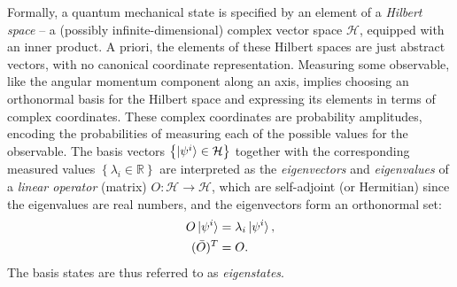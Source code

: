 \documentclass[final,3p,mathptmx]{elsarticle}
\begin{document}
Formally, a quantum mechanical state is specified by an element of a \emph{Hilbert space} -- a (possibly infinite-dimensional) complex vector space $\mathcal{H}$, equipped with an inner product. A priori, the elements of these Hilbert spaces are just abstract vectors, with no canonical coordinate representation. Measuring some observable, like the angular momentum component along an axis, implies choosing an orthonormal basis for the Hilbert space and expressing its elements in terms of complex coordinates. These complex coordinates are probability amplitudes, encoding the probabilities of measuring each of the possible values for the observable. The basis vectors $ \left\lbrace \ket{\psi^{i}} \in \mathcal{H}\right\rbrace  $ together with the corresponding measured values $ \left\lbrace \lambda_{i} \in \mathbb{R} \right\rbrace  $ are interpreted as the \emph{eigenvectors} and \emph{eigenvalues} of a \emph{linear operator} (matrix) $O: \mathcal{H} \rightarrow \mathcal{H}$, which are self-adjoint (or Hermitian) since the eigenvalues are real numbers, and the eigenvectors form an orthonormal set:
\begin{align}
O \ket{\psi^{i}} &= \lambda_{i}\ket{\psi^{i}}, \\
(\bar{O})^{T} &= O.
\end{align}
The basis states are thus referred to as \emph{eigenstates}. %
\end{document}
